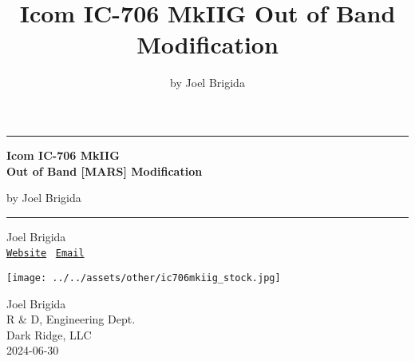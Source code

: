 \documentclass{report}
\title{Icom IC-706 MkIIG Out of Band Modification}
\author{by Joel Brigida}
\date{} %
\begin{document}
\begin{titlepage}
    \centering
    \vspace*{1cm}

    \rule{\textwidth}{1pt}

    \vspace{.7\baselineskip}
    {\huge \textbf{Icom IC-706 MkIIG \\ \vspace*{.5cm} Out of Band [MARS] Modification}}

    \vspace*{.5cm}
    {\LARGE by Joel Brigida}
    
    \rule{\textwidth}{1pt}
    \vspace{1cm}

    \large

    \begin{minipage}{.5\textwidth}
        \centering
        Joel Brigida \\
        {\normalsize \texttt{\href{https://joelbrigida.com}{Website}}} \, {\normalsize \texttt{\href{mailto:joel@joelbrigida.com}{Email}}}
    \end{minipage}

    \vspace{3cm}

    \texttt{[image: ../../assets/other/ic706mkiig\_stock.jpg]} %
    \vfill

    Joel Brigida \\
    R \& D, Engineering Dept. \\
    Dark Ridge, LLC \\
    2024-06-30 \\

\end{titlepage}

\tableofcontents
\setcounter{page}{1} %
\end{document}
